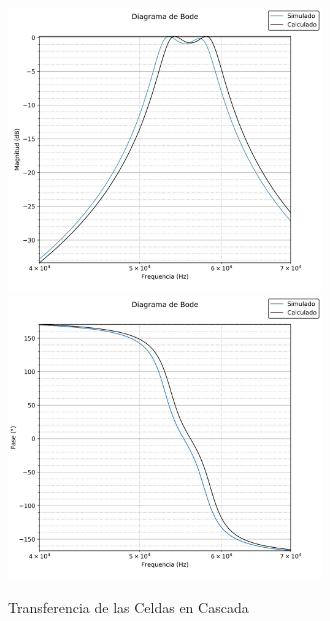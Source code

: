 \begin{figure}[ht]
\begin{center}
\includegraphics[height=7.5cm]{../Ex2/Informe/TransferenciaTotal.jpeg}
\includegraphics[height=7.5cm]{../Ex2/Informe/FaseTotal.jpeg}
\caption{Transferencia de las Celdas en Cascada}
\label{fig:e2 H total}
\end{center}
\end{figure}

